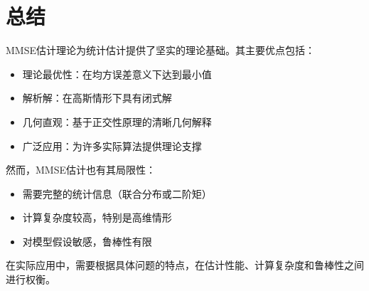 \documentclass[11pt]{article}
\begin{document}
\section{总结}

MMSE估计理论为统计估计提供了坚实的理论基础。其主要优点包括：
\begin{itemize}[itemsep=0pt]
\item 理论最优性：在均方误差意义下达到最小值
\item 解析解：在高斯情形下具有闭式解
\item 几何直观：基于正交性原理的清晰几何解释
\item 广泛应用：为许多实际算法提供理论支撑
\end{itemize}

然而，MMSE估计也有其局限性：
\begin{itemize}[itemsep=0pt]
\item 需要完整的统计信息（联合分布或二阶矩）
\item 计算复杂度较高，特别是高维情形
\item 对模型假设敏感，鲁棒性有限
\end{itemize}

在实际应用中，需要根据具体问题的特点，在估计性能、计算复杂度和鲁棒性之间进行权衡。
\end{document}
